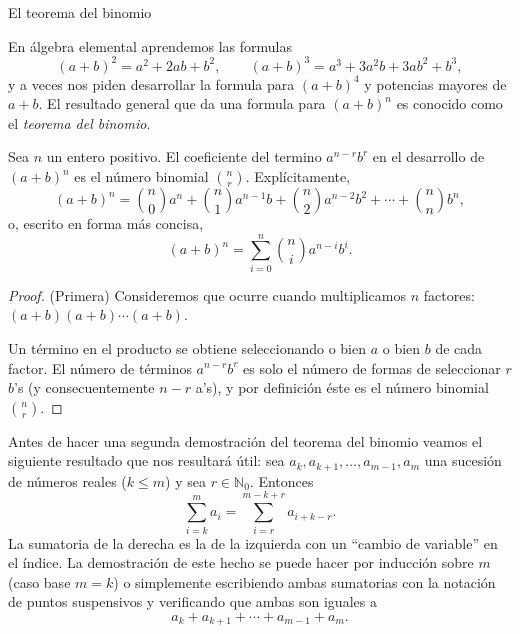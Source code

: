 \begin{section}{El teorema del binomio}

En álgebra elemental aprendemos las formulas
$$
(a+b)^2 = a^2 +2ab +b^2, \qquad (a+b)^3 = a^3 + 3 a^2b +3ab^2 +
b^3,
$$
y a veces nos piden desarrollar la formula para $(a+b)^4$ y potencias mayores de $a+b$. El resultado general que da una formula para $(a+b)^n$ es conocido como el  \textit{{teorema del binomio}}.  

\begin{teorema}\label{t3.6}
Sea $n$ un entero positivo. El coeficiente del termino $a^{n-r}b^r$ en el desarrollo de $(a+b)^n$ es el número binomial $\binom{n}{r}$. Explícitamente, 
\begin{equation*}
(a+b)^n= \binom{n}{0} a^n + \binom{n}{1} a^{n-1}b+ \binom{n}{2}
a^{n-2}b^2 + \cdots + \binom{n}{n} b^n,
\end{equation*}
o,  escrito en forma más concisa, 
\begin{equation}\label{eq-th-bin-1}
(a+b)^n= \sum_{i=0}^{n}\binom{n}{i} a^{n-i}b^i.
\end{equation}

\end{teorema}
\begin{proof}(Primera) Consideremos que ocurre cuando multiplicamos $n$ factores: $(a+b)(a+b) \cdots (a+b)$.

Un término en el producto se obtiene seleccionando o bien $a$ o bien $ b$ de cada factor. El número de términos $a^{n-r}b^r$ es solo el número de formas de seleccionar $r$ $b$'s (y consecuentemente $n-r$ a's), y por definición éste es el número binomial $\binom{n}{r}$.
\end{proof}


\begin{observacion}\label{cvar} Antes de hacer una segunda demostración del teorema del binomio veamos el siguiente resultado que nos resultará útil: sea $a_k,a_{k+1},\ldots,a_{m-1},a_m$ una sucesión de números reales ($k \le m$) y sea $r \in \mathbb N_0$.  Entonces
$$
\sum_{i=k}^m a_i = \sum_{i=r}^{m-k+r} a_{i+k-r}.
$$ 
La sumatoria de la derecha es la de la izquierda con un ``cambio de variable'' en el índice. La demostración de este hecho se puede hacer por inducción sobre $m$ (caso base $m=k$) o simplemente escribiendo ambas sumatorias con la notación de puntos suspensivos y verificando que ambas son iguales a
$$
a_k+a_{k+1}+\cdots+a_{m-1}+a_m.
$$  
\end{observacion}



\end{section}

